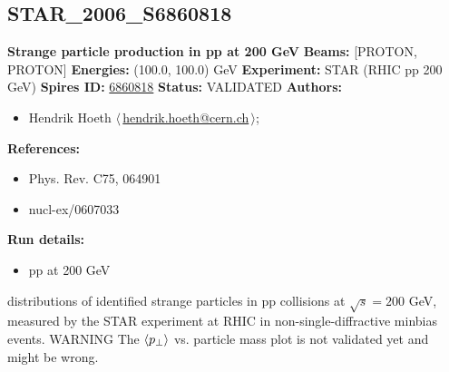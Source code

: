 \subsection[STAR\_2006\_S6860818]{STAR\_2006\_S6860818\,\cite{Abelev:2006cs}}
\textbf{Strange particle production in pp at 200 GeV}\newline
\textbf{Beams:} [PROTON, PROTON] \newline
\textbf{Energies:} (100.0, 100.0) GeV \newline
\textbf{Experiment:} STAR (RHIC pp 200 GeV) \newline
\textbf{Spires ID:} \href{http://www.slac.stanford.edu/spires/find/hep/www?rawcmd=key+6860818}{6860818}\newline
\textbf{Status:} VALIDATED\newline
\textbf{Authors:}
\begin{itemize}
  \item Hendrik Hoeth $\langle\,$\href{mailto:hendrik.hoeth@cern.ch}{hendrik.hoeth@cern.ch}$\,\rangle$;
\end{itemize}
\textbf{References:}
\begin{itemize}
  \item Phys. Rev. C75, 064901
  \item nucl-ex/0607033
\end{itemize}
\textbf{Run details:}
\begin{itemize}

  \item pp at 200 GeV\end{itemize}

\noindent \pT distributions of identified strange particles in pp collisions at $\sqrt{s} = 200$ GeV, measured by the STAR experiment at RHIC in non-single-diffractive minbias events. WARNING The $\langle p_\perp \rangle$ vs. particle mass plot is not validated yet and might be wrong.

\clearpage


\clearpage

